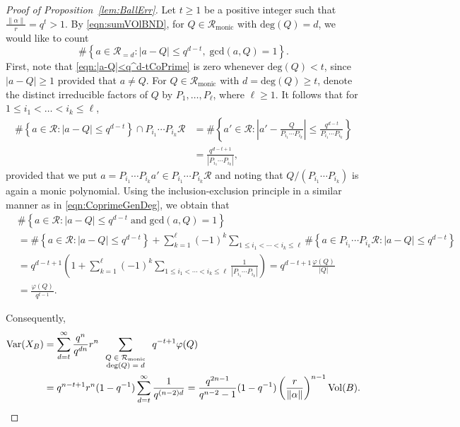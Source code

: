 \documentclass[11pt,a4paper,reqno]{amsart}
\def\gcd{\mathrm{gcd}}
\def\deg{\mathrm{deg}}
\def\vol{\mathrm{Vol}}
\newcommand{\Rmo}{\mathcal R_{\text{monic}}}
\theoremstyle{definition}
\theoremstyle{remark}
\numberwithin{equation}{section}
\begin{document}
\begin{proof}[Proof of Proposition~\ref{lem:BallErr}]
Let $t\ge 1$ be a positive integer such that $\frac {\|\alpha\|}{r} = q^t>1$. By \eqref{eqn:sumVOlBND}, for $Q\in \mathcal{R}_{\text{monic}}$ with $\deg(Q)=d$, we would like to count
\begin{equation}
\label{eqn:|a-Q|<q^d-tCoPrime}
\#\left\{a\in \mathcal R_{=d}: |a-Q|\le q^{d-t},\;\gcd(a,Q)=1 \right\}.
\end{equation}
First, note that \eqref{eqn:|a-Q|<q^d-tCoPrime} is zero whenever $\deg(Q)<t$, since $|a-Q|\ge 1$ provided that $a\neq Q$.
For $Q\in \Rmo$ with $d=\deg(Q)\ge t$, denote the distinct irreducible factors of $Q$ by $P_1,\ldots, P_{\ell}$, where $\ell\ge 1$. It follows that for $1\le i_1 < \ldots < i_k\le \ell$, 
\[\begin{split}
\#\left\{a\in \mathcal R: |a-Q|\le q^{d-t} \right\}\cap P_{i_1}\cdots P_{i_k}\mathcal R
&=\#\left\{a'\in \mathcal R: \left|a'-\frac{Q}{P_{i_1}\cdots P_{i_k}}\right|\le \frac{q^{d-t}}{P_{i_1}\cdots P_{i_k}}\right\}\\
&=\frac{q^{d-t+1}}{|P_{i_1}\cdots P_{i_k}|},
\end{split}\]
provided that we put $a=P_{i_1}\cdots P_{i_k}a'\in P_{i_1}\cdots P_{i_k}\mathcal R$ and noting that $Q/(P_{i_1}\cdots P_{i_k})$ is again a monic polynomial. Using the inclusion-exclusion principle in a similar manner as in \eqref{eqn:CoprimeGenDeg}, we obtain that
\[\begin{split}
    &\#\left\{a\in \mathcal R: |a-Q|\le q^{d-t}\;\text{and}\; \gcd(a,Q)=1 \right\}\\
    &=\#\left\{a\in \mathcal R: |a-Q|\le q^{d-t}\right\}
   +\sum_{k=1}^\ell (-1)^k \sum_{1\le i_1 < \cdots < i_k \le \ell}
    \#\left\{a\in P_{i_1}\cdots P_{i_k} \mathcal R: |a-Q|\le q^{d-t}\right\}\\
    &=q^{d-t+1}\left(1+\sum_{k=1}^\ell (-1)^k \sum_{1\le i_1< \cdots < i_k\le \ell} \frac 1 {|P_{i_1} \cdots P_{i_k}|}\right)
    =q^{d-t+1} \frac {\varphi(Q)}{|Q|}\\
    &=\frac{\varphi(Q)}{q^{t-1}}.
\end{split}\]

Consequently,
\[\begin{split}
\operatorname{Var}(X_{B})
&=\sum_{d=t}^\infty \frac {q^n}{q^{dn}} r^n
\sum_{\scriptsize \begin{array}{c}
Q\in \Rmo\\
\deg(Q)=d\end{array}} q^{-t+1}\varphi(Q)\\
&=q^{n-t+1}r^n(1-q^{-1})\sum_{d=t}^\infty \frac 1 {q^{(n-2)d}} 
=\frac {q^{2n-1}}{q^{n-2}-1}(1-q^{-1})\left(\frac{r}{\Vert \alpha\Vert}\right)^{n-1}\vol(B).
\end{split}\]
\end{proof}
\end{document}
